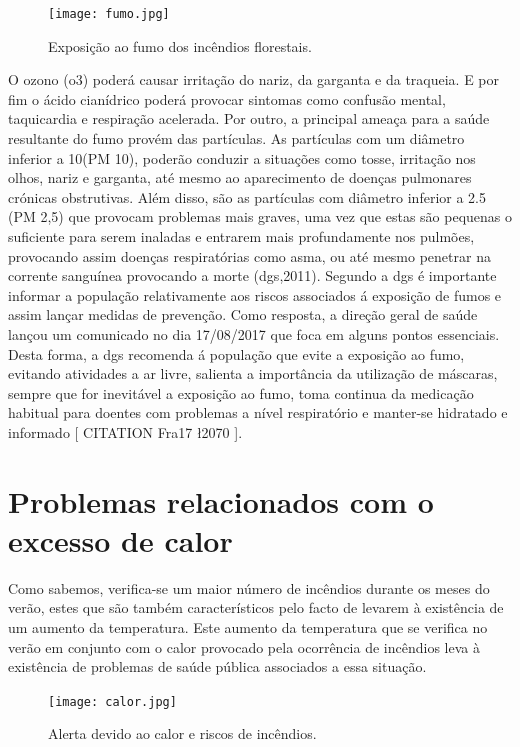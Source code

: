\documentclass{report}
\begin{document}
\begin{figure}[H]
\center
\texttt{[image: fumo.jpg]}
\caption{Exposição ao fumo dos incêndios florestais.}
\end{figure}


O ozono (\ac{o3}) poderá causar irritação do nariz, da garganta e da traqueia. E por fim o ácido cianídrico poderá provocar sintomas como confusão mental, taquicardia e respiração acelerada. 
Por outro, a principal ameaça para a saúde resultante do fumo provém das partículas. As partículas com um diâmetro inferior a 10\micro\meter (PM 10), poderão conduzir a situações como tosse, irritação nos olhos, nariz e garganta, até mesmo ao aparecimento de doenças pulmonares crónicas obstrutivas. Além disso, são as partículas com diâmetro inferior a 2.5 \micro\meter (PM 2,5) que provocam problemas mais graves, uma vez que estas são pequenas o suficiente para serem inaladas e entrarem mais profundamente nos pulmões, provocando assim doenças respiratórias como asma, ou até mesmo penetrar na corrente sanguínea provocando a morte (\ac{dgs},2011).
Segundo a \ac{dgs} é importante informar a população relativamente aos riscos associados á exposição de fumos e assim lançar medidas de prevenção. Como resposta, a direção geral de saúde lançou um comunicado no dia 17/08/2017 que foca em alguns pontos essenciais. Desta forma, a \ac{dgs} recomenda á população que evite a exposição ao fumo, evitando atividades a ar livre, salienta a importância da utilização de máscaras, sempre que for inevitável a exposição ao fumo, toma continua da medicação habitual para doentes com problemas a nível respiratório e manter-se hidratado e informado [ CITATION Fra17 \l 2070 ].


\section{Problemas relacionados com o excesso de calor}
\label{problemas relacionados com o excesso de calor}
\cite{dgsriscos}

Como sabemos, verifica-se um maior número de incêndios durante os meses do verão, estes que são também característicos pelo facto de levarem à existência de um aumento da temperatura. Este aumento da temperatura que se verifica no verão em conjunto com o calor provocado pela ocorrência de incêndios leva à existência de problemas de saúde pública associados a essa situação.

\begin{figure}[H]
\center
\texttt{[image: calor.jpg]}
\caption{Alerta devido ao calor e riscos de incêndios.}
\end{figure}
\end{document}
